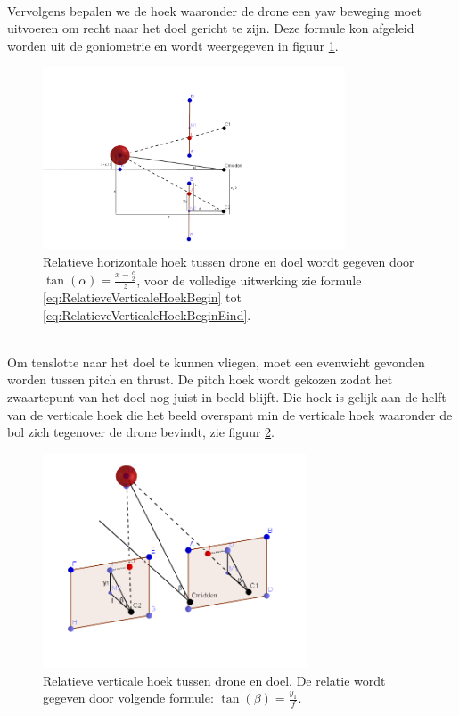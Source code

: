 \\
Vervolgens bepalen we de hoek waaronder de drone een yaw beweging moet uitvoeren om recht naar het doel gericht te zijn. Deze formule kon afgeleid worden uit de goniometrie en wordt weergegeven in figuur \ref{fig:RelatieveHorizontaleHoek}. 
\begin{figure}[h]
	\centering
	\includegraphics[width=0.8\textwidth]{RelatieveHorizontaleHoek.png}
	\caption{Relatieve horizontale hoek tussen drone en doel wordt gegeven door \(\tan(\alpha) = \frac{x-\frac{c}{2}}{z}\), voor de volledige uitwerking zie formule \ref{eq:RelatieveVerticaleHoekBegin} tot \ref{eq:RelatieveVerticaleHoekBeginEind}.}
	\label{fig:RelatieveHorizontaleHoek}
\end{figure}
\\
Om tenslotte naar het doel te kunnen vliegen, moet een evenwicht gevonden worden tussen pitch en thrust. De pitch hoek wordt gekozen zodat het zwaartepunt van het doel nog juist in beeld blijft. Die hoek is gelijk aan de helft van de verticale hoek die het beeld overspant min de verticale hoek waaronder de bol zich tegenover de drone bevindt, zie figuur \ref{fig:RelatieveVerticaleHoek}. 
\begin{figure}[h]
	\centering
	\includegraphics[width=0.7\textwidth]{RelatieveVerticaleHoek.png}
	\caption{Relatieve verticale hoek tussen drone en doel. De relatie wordt gegeven door volgende formule: \(\tan(\beta) = \frac{y_1}{f}\).}
	\label{fig:RelatieveVerticaleHoek}
\end{figure}
